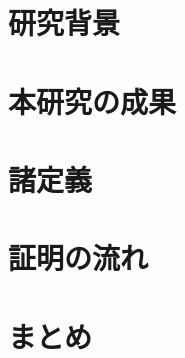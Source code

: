 \documentclass[a4j,twoside]{jarticle}
\begin{document}
\twocolumn[\vspace*{9mm}]
\begin{論文概要}
\setcounter{page}{1}


\section{研究背景}

\section{本研究の成果}

\section{諸定義}

\section{証明の流れ}

\section{まとめ}




\begin{thebibliography}{1}
    \bibitem{}
\end{thebibliography}

\clearpage
\end{論文概要}
\end{document}
